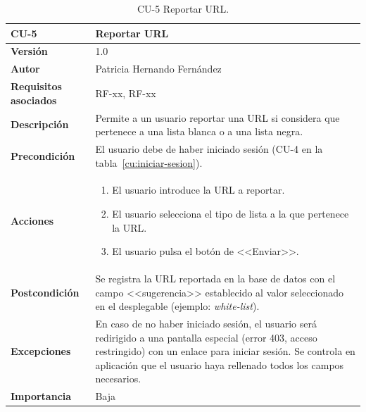 \begin{table}[p]
	\centering
	\begin{tabularx}{\linewidth}{ p{} p{} }
		\toprule
		\textbf{CU-5}    & \textbf{Reportar URL}\\
		\toprule
		\textbf{Versión}              & 1.0    \\
		\textbf{Autor}                & Patricia Hernando Fernández \\
		\textbf{Requisitos asociados} & RF-xx, RF-xx \\
		\textbf{Descripción}          & Permite a un usuario reportar una
		URL si considera que pertenece a una lista blanca o a una lista negra.\\
		\textbf{Precondición}         & El usuario debe de haber iniciado sesión (CU-4 en la tabla~\ref{cu:iniciar-sesion}). \\
		\textbf{Acciones}             &
		\begin{enumerate}
			\def\labelenumi{\arabic{enumi}.}
			\tightlist
			\item El usuario introduce la URL a reportar.
			\item El usuario selecciona el tipo de lista a la que pertenece la URL.
			\item El usuario pulsa el botón de <<Enviar>>.
		\end{enumerate}\\
		\textbf{Postcondición}        & Se registra la URL reportada en la base de datos con el campo <<sugerencia>> establecido al valor seleccionado en el desplegable (ejemplo: \textit{white-list}). \\
		\textbf{Excepciones}          & En caso de no haber iniciado sesión, el usuario será redirigido a una pantalla especial (error 403, acceso restringido) con un enlace para iniciar sesión. Se controla en aplicación que el usuario haya rellenado todos los campos necesarios. \\
		\textbf{Importancia}          & Baja \\
		\bottomrule
	\end{tabularx}
	\caption{CU-5 Reportar URL.}
	\label{cu:reportar-url}
\end{table}


